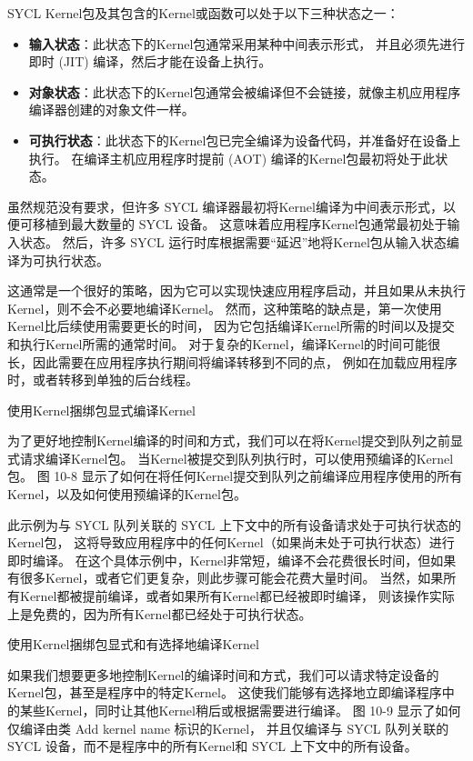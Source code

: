 SYCL Kernel包及其包含的Kernel或函数可以处于以下三种状态之一：

\begin{itemize}
	\item \textbf{输入状态}：此状态下的Kernel包通常采用某种中间表示形式，
	并且必须先进行即时 (JIT) 编译，然后才能在设备上执行。

	\item \textbf{对象状态}：此状态下的Kernel包通常会被编译但不会链接，就像主机应用程序编译器创建的对象文件一样。

	\item \textbf{可执行状态}：此状态下的Kernel包已完全编译为设备代码，并准备好在设备上执行。 
	在编译主机应用程序时提前 (AOT) 编译的Kernel包最初将处于此状态。
\end{itemize}

虽然规范没有要求，但许多 SYCL 编译器最初将Kernel编译为中间表示形式，以便可移植到最大数量的 SYCL 设备。 
这意味着应用程序Kernel包通常最初处于输入状态。 
然后，许多 SYCL 运行时库根据需要“延迟”地将Kernel包从输入状态编译为可执行状态。

这通常是一个很好的策略，因为它可以实现快速应用程序启动，并且如果从未执行Kernel，则不会不必要地编译Kernel。 
然而，这种策略的缺点是，第一次使用Kernel比后续使用需要更长的时间，
因为它包括编译Kernel所需的时间以及提交和执行Kernel所需的通常时间。 
对于复杂的Kernel，编译Kernel的时间可能很长，因此需要在应用程序执行期间将编译转移到不同的点，
例如在加载应用程序时，或者转移到单独的后台线程。

{\color{red} 使用Kernel捆绑包显式编译Kernel}

为了更好地控制Kernel编译的时间和方式，我们可以在将Kernel提交到队列之前显式请求编译Kernel包。 
当Kernel被提交到队列执行时，可以使用预编译的Kernel包。 
图 10-8 显示了如何在将任何Kernel提交到队列之前编译应用程序使用的所有Kernel，以及如何使用预编译的Kernel包。

此示例为与 SYCL 队列关联的 SYCL 上下文中的所有设备请求处于可执行状态的Kernel包，
这将导致应用程序中的任何Kernel（如果尚未处于可执行状态）进行即时编译。 
在这个具体示例中，Kernel非常短，编译不会花费很长时间，但如果有很多Kernel，或者它们更复杂，则此步骤可能会花费大量时间。 
当然，如果所有Kernel都被提前编译，或者如果所有Kernel都已经被即时编译，
则该操作实际上是免费的，因为所有Kernel都已经处于可执行状态。

{\color{red} 使用Kernel捆绑包显式和有选择地编译Kernel}

如果我们想要更多地控制Kernel的编译时间和方式，我们可以请求特定设备的Kernel包，甚至是程序中的特定Kernel。 
这使我们能够有选择地立即编译程序中的某些Kernel，同时让其他Kernel稍后或根据需要进行编译。 
图 10-9 显示了如何仅编译由类 Add kernel name 标识的Kernel，
并且仅编译与 SYCL 队列关联的 SYCL 设备，而不是程序中的所有Kernel和 SYCL 上下文中的所有设备。

